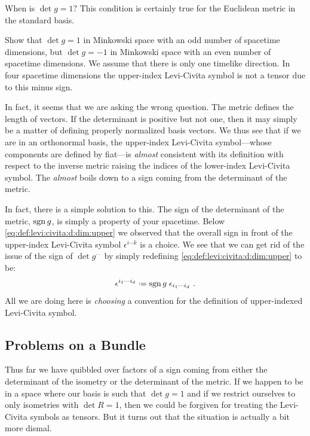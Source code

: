 \begin{subappendices}
When is $\det g = 1?$ This condition is certainly true for the Euclidean metric in the standard basis. 
\begin{exercise}
Show that $\det g =1$ in Minkowski space with an odd number of spacetime dimensions, but $\det g = -1$ in Minkowski space with an even number of spacetime dimensions. We assume that there is only one timelike direction. In four spacetime dimensions the upper-index Levi-Civita symbol is not a tensor due to this minus sign.
\end{exercise}
In fact, it seems that we are asking the wrong question. The metric defines the length of vectors. If the determinant is positive but not one, then it may simply be a matter of defining properly normalized basis vectors. We thus see that if we are in an orthonormal basis, the upper-index Levi-Civita symbol---whose components are defined by fiat---is \emph{almost} consistent with its definition with respect to the inverse metric raising the indices of the lower-index Levi-Civita symbol. The \emph{almost} boils down to a sign coming from the determinant of the metric.

In fact, there is a simple solution to this. The sign of the determinant of the metric, $\operatorname{\textnormal{sgn}} g$, is simply a property of your spacetime. Below \eqref{eq:def:levi:civita:d:dim:upper} we observed that the overall sign in front of the upper-index Levi-Civita symbol $\epsilon^{i\cdots k}$ is a choice. We see that we can get rid of the issue of the sign of $\det g^{\cdot\cdot}$ by simply redefining \eqref{eq:def:levi:civita:d:dim:upper} to be:
\begin{align}
    \epsilon^{i_1\cdots i_d}
    \defeq
    \sgn g\; 
    \epsilon_{i_1\cdots i_d} \ .
    \label{eq:def:levi:civita:d:dim:upper:with:sign}
\end{align}
All we are doing here is \emph{choosing} a convention for the definition of upper-indexed Levi-Civita symbol.

\subsection{Problems on a Bundle} 

Thus far we have quibbled over factors of a sign coming from either the determinant of the isometry or the determinant of the metric. If we happen to be in a space where our basis is such that $\det g = 1$ and if we restrict ourselves to only isometries with $\det R = 1$, then we could be forgiven for treating the Levi-Civita symbols as tensors. But it turns out that the situation is actually a bit more dismal.


\end{subappendices}
